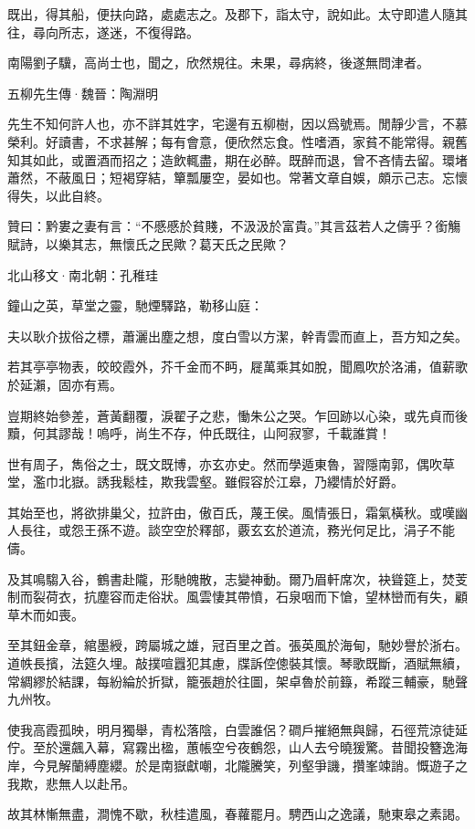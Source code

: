 \documentclass[12pt,a4paper]{ctexbook}
\begin{document}
既出，得其船，便扶向路，處處志之。及郡下，詣太守，說如此。太守即遣人隨其往，尋向所志，遂迷，不復得路。\par
南陽劉子驥，高尚士也，聞之，欣然規往。未果，尋病終，後遂無問津者。\par
五柳先生傳·魏晉：陶淵明 \par
先生不知何許人也，亦不詳其姓字，宅邊有五柳樹，因以爲號焉。閒靜少言，不慕榮利。好讀書，不求甚解；每有會意，便欣然忘食。性嗜酒，家貧不能常得。親舊知其如此，或置酒而招之；造飲輒盡，期在必醉。既醉而退，曾不吝情去留。環堵蕭然，不蔽風日；短褐穿結，簞瓢屢空，晏如也。常著文章自娛，頗示己志。忘懷得失，以此自終。\par
贊曰：黔婁之妻有言：“不慼慼於貧賤，不汲汲於富貴。”其言茲若人之儔乎？銜觴賦詩，以樂其志，無懷氏之民歟？葛天氏之民歟？\par
北山移文·南北朝：孔稚珪 \par
鐘山之英，草堂之靈，馳煙驛路，勒移山庭：\par
夫以耿介拔俗之標，蕭灑出塵之想，度白雪以方潔，幹青雲而直上，吾方知之矣。\par
若其亭亭物表，皎皎霞外，芥千金而不眄，屣萬乘其如脫，聞鳳吹於洛浦，值薪歌於延瀨，固亦有焉。\par
豈期終始參差，蒼黃翻覆，淚翟子之悲，慟朱公之哭。乍回跡以心染，或先貞而後黷，何其謬哉！嗚呼，尚生不存，仲氏既往，山阿寂寥，千載誰賞！\par
世有周子，雋俗之士，既文既博，亦玄亦史。然而學遁東魯，習隱南郭，偶吹草堂，濫巾北嶽。誘我鬆桂，欺我雲壑。雖假容於江皋，乃纓情於好爵。\par
其始至也，將欲排巢父，拉許由，傲百氏，蔑王侯。風情張日，霜氣橫秋。或嘆幽人長往，或怨王孫不遊。談空空於釋部，覈玄玄於道流，務光何足比，涓子不能儔。\par
及其鳴騶入谷，鶴書赴隴，形馳魄散，志變神動。爾乃眉軒席次，袂聳筵上，焚芰制而裂荷衣，抗塵容而走俗狀。風雲悽其帶憤，石泉咽而下愴，望林巒而有失，顧草木而如喪。\par
至其鈕金章，綰墨綬，跨屬城之雄，冠百里之首。張英風於海甸，馳妙譽於浙右。道帙長擯，法筵久埋。敲撲喧囂犯其慮，牒訴倥傯裝其懷。琴歌既斷，酒賦無續，常綢繆於結課，每紛綸於折獄，籠張趙於往圖，架卓魯於前籙，希蹤三輔豪，馳聲九州牧。\par
使我高霞孤映，明月獨舉，青松落陰，白雲誰侶？磵戶摧絕無與歸，石徑荒涼徒延佇。至於還飆入幕，寫霧出楹，蕙帳空兮夜鶴怨，山人去兮曉猨驚。昔聞投簪逸海岸，今見解蘭縛塵纓。於是南嶽獻嘲，北隴騰笑，列壑爭譏，攢峯竦誚。慨遊子之我欺，悲無人以赴吊。\par
故其林慚無盡，澗愧不歇，秋桂遣風，春蘿罷月。騁西山之逸議，馳東皋之素謁。\par
\end{document}

